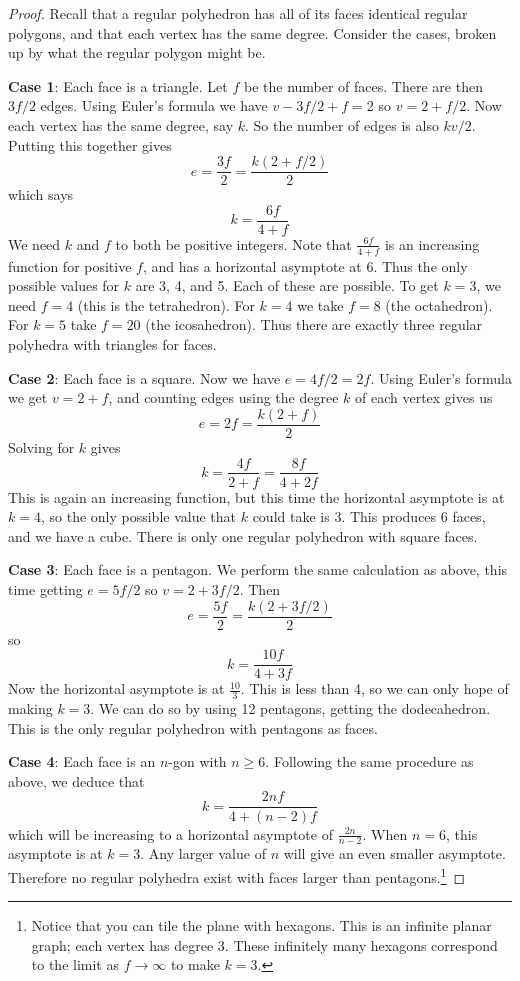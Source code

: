 \documentclass[12pt]{article}
\begin{document}
\begin{proof}
Recall that a regular polyhedron has all of its faces identical regular polygons, and that each vertex has the same degree.   Consider the cases, broken up by what the regular polygon might be.

\textbf{Case 1}: Each face is a triangle.  Let $f$ be the number of faces.  There are then $3f/2$ edges.  Using Euler's formula we have $v - 3f/2 + f = 2$ so $v = 2 + f/2$.  Now each vertex has the same degree, say $k$.  So the number of edges is also $kv/2$.  Putting this together gives \[e = \frac{3f}{2} = \frac{k(2+f/2)}{2}\] which says 
\[k = \frac{6f}{4+f}\]
We need $k$ and $f$ to both be positive integers.  Note that $\frac{6f}{4+f}$ is an increasing function for positive $f$, and has a horizontal asymptote at 6.  Thus the only possible values for $k$ are 3, 4, and 5.  Each of these are possible.  To get $k = 3$, we need $f = 4$ (this is the tetrahedron).  For $k = 4$ we take $f = 8$ (the octahedron).  For $k = 5$ take $f = 20$ (the icosahedron).  Thus there are exactly three regular polyhedra with triangles for faces.

\textbf{Case 2}: Each face is a square.  Now we have $e = 4f/2 = 2f$.  Using Euler's formula we get $v = 2 + f$, and counting edges using the degree $k$ of each vertex gives us
\[e = 2f = \frac{k(2+f)}{2}\]
Solving for $k$ gives 
\[k = \frac{4f}{2+f} = \frac{8f}{4+2f}\]
This is again an increasing function, but this time the horizontal asymptote is at $k = 4$, so the only possible value that $k$ could take is 3.  This produces 6 faces, and we have a cube.  There is only one regular polyhedron with square faces.

\textbf{Case 3}: Each face is a pentagon.  We perform the same calculation as above, this time getting $e = 5f/2$ so $v = 2 + 3f/2$.  Then
\[e = \frac{5f}{2} = \frac{k(2+3f/2)}{2}\]
so
\[k = \frac{10f}{4+3f}\]
Now the horizontal asymptote is at $\frac{10}{3}$.  This is less than 4, so we can only hope of making $k = 3$.  We can do so by using 12 pentagons, getting the dodecahedron.  This is the only regular polyhedron with pentagons as faces.

\textbf{Case 4}: Each face is an $n$-gon with $n \ge 6$.  Following the same procedure as above, we deduce that
\[k = \frac{2nf}{4+(n-2)f}\]
which will be increasing to a horizontal asymptote of $\frac{2n}{n-2}$.  When $n = 6$, this asymptote is at $k = 3$.  Any larger value of $n$ will give an even smaller asymptote.  Therefore no regular polyhedra exist with faces larger than pentagons.\footnote{Notice that you can tile the plane with hexagons.  This is an infinite planar graph; each vertex has degree 3.  These infinitely many hexagons correspond to the limit as $f \to \infty$ to make $k = 3$.}
\end{proof}
\end{document}
